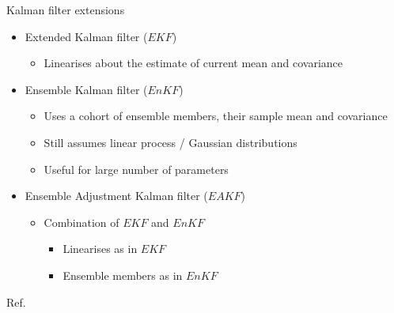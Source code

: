 \documentclass[11pt,compress,aspectratio=1610]{beamer}
\begin{document}
\begin{frame}{Kalman filter extensions}
\begin{itemize}
    \item Extended Kalman filter ($EKF$)
        \begin{itemize}
            \item \alert{Linearises} about the estimate of current mean and covariance
        \end{itemize}
    \item Ensemble Kalman filter ($EnKF$) 
        \begin{itemize}
            \item Uses a \alert{cohort} of ensemble members, their sample mean and covariance
            \item Still assumes linear process / Gaussian distributions
            \item Useful for large number of parameters
        \end{itemize}
    \item Ensemble Adjustment Kalman filter ($EAKF$) 
	    \begin{itemize}
	        \item Combination of $EKF$ and $EnKF$ 
	        \begin{itemize}
	            \item \alert{Linearises} as in $EKF$
	            \item \alert{Ensemble members} as in $EnKF$
	        \end{itemize}
	    \end{itemize}
\end{itemize}
\vfill\hfill{\scriptsize Ref. \cite{Shaman2014} }
\end{frame}
\end{document}
